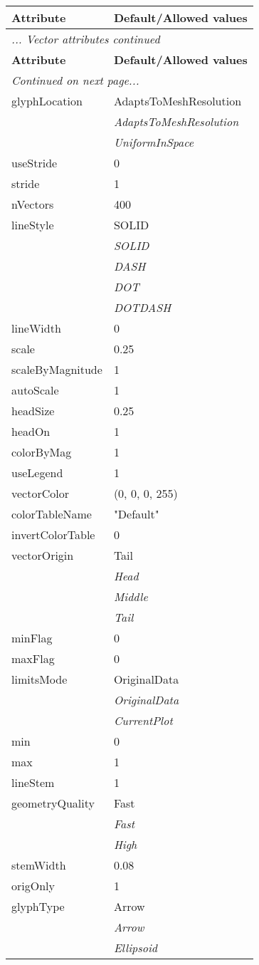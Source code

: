 \documentclass[10pt,a4paper]{report}
\begin{document}
\begin{longtable}{ll}
{\bf Attribute} & {\bf Default/Allowed values} \\
\hline \hline
\endfirsthead
\multicolumn{2}{l}{{\it ... Vector attributes continued}} \\
{\bf Attribute} & {\bf Default/Allowed values} \\
\hline \hline
\endhead
\hline
\multicolumn{2}{l}{{\it Continued on next page...}} \\
\endfoot
\hline
\endlastfoot

glyphLocation  &  AdaptsToMeshResolution   \\
 & {\it  AdaptsToMeshResolution} \\
 & {\it  UniformInSpace} \\
useStride  &  0 \\
stride  &  1 \\
nVectors  &  400 \\
lineStyle  &  SOLID   \\
 & {\it  SOLID} \\
 & {\it  DASH} \\
 & {\it  DOT} \\
 & {\it  DOTDASH} \\
lineWidth  &  0 \\
scale  &  0.25 \\
scaleByMagnitude  &  1 \\
autoScale  &  1 \\
headSize  &  0.25 \\
headOn  &  1 \\
colorByMag  &  1 \\
useLegend  &  1 \\
vectorColor  &  (0, 0, 0, 255) \\
colorTableName  &  "Default" \\
invertColorTable  &  0 \\
vectorOrigin  &  Tail   \\
 & {\it  Head} \\
 & {\it  Middle} \\
 & {\it  Tail} \\
minFlag  &  0 \\
maxFlag  &  0 \\
limitsMode  &  OriginalData   \\
 & {\it  OriginalData} \\
 & {\it  CurrentPlot} \\
min  &  0 \\
max  &  1 \\
lineStem  &  1 \\
geometryQuality  &  Fast   \\
 & {\it  Fast} \\
 & {\it  High} \\
stemWidth  &  0.08 \\
origOnly  &  1 \\
glyphType  &  Arrow   \\
 & {\it  Arrow} \\
 & {\it  Ellipsoid} \\
\end{longtable}
\end{document}
